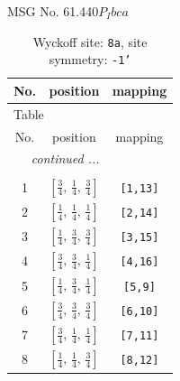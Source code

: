 \documentclass[fleqn,8pt]{jsarticle}
\begin{document}
\setcounter{MaxMatrixCols}{32}

\renewcommand{\tablename}{Table~}
\renewcommand{\figurename}{Figure~}
\begin{center}
\LARGE
MSG No. 61.440\quad$P_{I}bca$
\end{center}
\renewcommand{\arraystretch}{1.2}
\begin{longtable}{ccc}
\caption{Wyckoff site: {\tt 8a}, site symmetry: {\tt -1'}}
 \\
 \hline \hline
No. & position & mapping \\ \hline \endfirsthead

\multicolumn{2}{l}{\tablename\ \thetable{}} \\
 \hline \hline
No. & position & mapping \\ \hline \endhead

 \hline \hline
\multicolumn{2}{r}{\footnotesize\it continued ...} \\ \endfoot

 \hline \hline
\multicolumn{2}{r}{} \\ \endlastfoot

1 & $\left[ \frac{3}{4},\, \frac{1}{4},\, \frac{3}{4} \right]$ & {\tt [1,13]} \\ \hline
2 & $\left[ \frac{1}{4},\, \frac{1}{4},\, \frac{1}{4} \right]$ & {\tt [2,14]} \\ \hline
3 & $\left[ \frac{1}{4},\, \frac{3}{4},\, \frac{3}{4} \right]$ & {\tt [3,15]} \\ \hline
4 & $\left[ \frac{3}{4},\, \frac{3}{4},\, \frac{1}{4} \right]$ & {\tt [4,16]} \\ \hline
5 & $\left[ \frac{1}{4},\, \frac{3}{4},\, \frac{1}{4} \right]$ & {\tt [5,9]} \\ \hline
6 & $\left[ \frac{3}{4},\, \frac{3}{4},\, \frac{3}{4} \right]$ & {\tt [6,10]} \\ \hline
7 & $\left[ \frac{3}{4},\, \frac{1}{4},\, \frac{1}{4} \right]$ & {\tt [7,11]} \\ \hline
8 & $\left[ \frac{1}{4},\, \frac{1}{4},\, \frac{3}{4} \right]$ & {\tt [8,12]} \\
\end{longtable}
\renewcommand{\arraystretch}{1.2}
\end{document}
